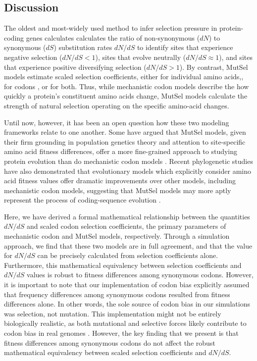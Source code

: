 \documentclass[11pt]{article}
\begin{document}
\subsection*{Discussion}
The oldest and most-widely used method to infer selection pressure in protein-coding genes calculates calculates the ratio of non-synonymous ($dN$) to synonymous ($dS$) substitution rates $dN/dS$ to identify sites that experience negative selection ($dN/dS<1$), sites that evolve neutrally ($dN/dS\approx1$), and sites that experience positive diversifying selection ($dN/dS>1$). By contrast, MutSel models estimate scaled selection coefficients, either for individual amino acids,\cite{HalpernBruno1998,NielsenYang2008,Rodrigueetal2010,Tamurietal2012,Tamurietal2014}, for codons \cite{YangNielsen2008}, or for both. Thus, while mechanistic codon models describe the how quickly a protein's constituent amino acids change, MutSel models calculate the strength of natural selection operating on the specific amino-acid changes.  

Until now, however, it has been an open question how these two modeling frameworks relate to one another. Some have argued that MutSel models, given their firm grounding in population genetics theory and attention to site-specific amino acid fitness differences, offer a more fine-grained approach to studying protein evolution than do mechanistic codon models \cite{HalpernBruno1998,Rodrigueetal2010}. Recent phylogenetic studies have also demonstrated that evolutionary models which explicitly consider amino acid fitness values offer dramatic improvements over other models, including mechanistic codon models, suggesting that MutSel models may more aptly represent the process of coding-sequence evolution \cite{Bloom2014a, Bloom2014b}. 

Here, we have derived a formal mathematical relationship between the quantities $dN/dS$ and scaled codon selection coefficients, the primary parameters of mechanistic codon and MutSel models, respectively. Through a simulation approach, we find that these two models are in full agreement, and that the value for $dN/dS$ can be precisely calculated from selection coefficients alone. Furthermore, this mathematical equivalency between selection coefficients and $dN/dS$ values is robust to fitness differences among synonymous codons. However, it is important to note that our implementation of codon bias explicitly assumed that frequency differences among synonymous codons resulted from fitness differences alone. In other words, the sole source of codon bias in our simulations was selection, not mutation. This implementation might not be entirely biologically realistic, as both mutational and selective forces likely contribute to codon bias in real genomes \cite{Blumer1991, Duret2002, HershbergPetrov2008, PlotkinKudla2010}. However, the key finding that we present is that fitness differences among synonymous codons do not affect the robust mathematical equivalency between scaled selection coefficients and $dN/dS$. 
\end{document}
